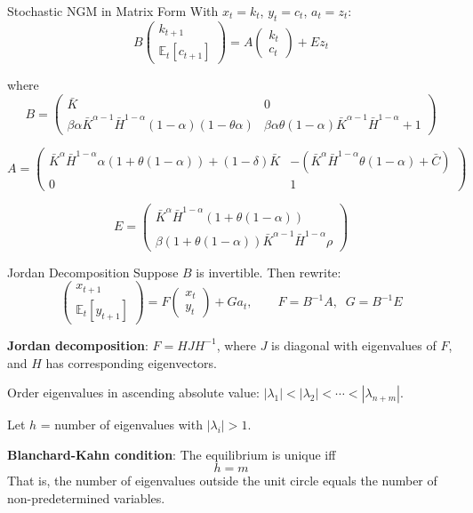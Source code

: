 \documentclass[blue]{beamer}
\newcommand{\E}{\mathbb{E}}
\begin{document}
\begin{frame}{Stochastic NGM in Matrix Form}
	\small
	With $x_t = k_t$, $y_t = c_t$, $a_t = z_t$:
	\[
	B \begin{pmatrix} k_{t+1} \\ \E_t[c_{t+1}] \end{pmatrix} = A \begin{pmatrix} k_t \\ c_t \end{pmatrix} + E z_t
	\]
	
	where
	\[
	B = \begin{pmatrix} \bar{K} & 0 \\ \beta \alpha \bar{K}^{\alpha-1} \bar{H}^{1-\alpha}(1-\alpha)(1-\theta\alpha) & \beta \alpha \theta(1-\alpha) \bar{K}^{\alpha-1} \bar{H}^{1-\alpha} + 1 \end{pmatrix}
	\]
	
	\[
	A = \begin{pmatrix} \bar{K}^\alpha \bar{H}^{1-\alpha} \alpha(1+\theta(1-\alpha)) + (1-\delta)\bar{K} & -(\bar{K}^\alpha \bar{H}^{1-\alpha}\theta(1-\alpha) + \bar{C}) \\ 0 & 1 \end{pmatrix}
	\]
	
	\[
	E = \begin{pmatrix} \bar{K}^\alpha \bar{H}^{1-\alpha}(1 + \theta(1-\alpha)) \\ \beta(1 + \theta(1-\alpha)) \bar{K}^{\alpha-1} \bar{H}^{1-\alpha} \rho \end{pmatrix}
	\]
\end{frame}

\begin{frame}{Jordan Decomposition}
	Suppose $B$ is invertible. Then rewrite:
	\[
	\begin{pmatrix} x_{t+1} \\ \E_t[y_{t+1}] \end{pmatrix} = F \begin{pmatrix} x_t \\ y_t \end{pmatrix} + G a_t, \qquad F = B^{-1} A, \;\; G = B^{-1} E
	\]

	\textbf{Jordan decomposition}: $F = H J H^{-1}$, where $J$ is diagonal with eigenvalues of $F$, and $H$ has corresponding eigenvectors.

	Order eigenvalues in ascending absolute value: $|\lambda_1| < |\lambda_2| < \cdots < |\lambda_{n+m}|$.
	

	Let $h$ = number of eigenvalues with $|\lambda_i| > 1$.
	

	\textbf{Blanchard-Kahn condition}: The equilibrium is unique iff
	\[
	h = m
	\]
	That is, the number of eigenvalues outside the unit circle equals the number of non-predetermined variables.
\end{frame}
\end{document}
